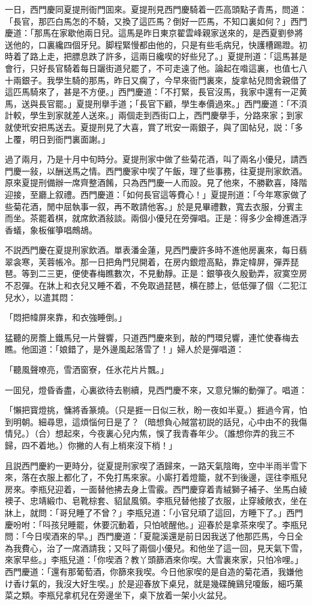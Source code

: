 一日，西門慶同夏提刑衙門囬來。夏提刑見西門慶騎着一匹高頭點子青馬，問道：「長官，那匹白馬怎的不騎，又換了這匹馬？倒好一匹馬，不知口裏如何？」西門慶道：「那馬在家歇他兩日兒。這馬是昨日東京翟雲峰親家送來的，是西夏劉參將送他的，口裏纔四個牙兒。脚程緊慢都由他的，只是有些毛病兒，快護槽踢蹬。初時着了路上走，把膘息跌了許多，這兩日纔喫的好些兒了。」夏提刑道：「這馬甚是會行，只好長官騎着每日躧街道兒罷了，不可走遠了他。論起在喒這裏，也值七八十兩銀子。我學生騎的那馬，昨日又瘸了，今早來衙門裏來，旋拿帖兒問舍親借了這匹馬騎來了，甚是不方便。」西門慶道：「不打緊，長官沒馬，我家中還有一疋黄馬，送與長官罷。」夏提刑擧手道；「長官下顧，學生奉價過來。」西門慶道：「不湏計較，學生到家就差人送來。」兩個走到西街口上，西門慶擧手，分路來家；到家就使玳安把馬送去。夏提刑見了大喜，賞了玳安一兩銀子，與了囬帖兒，説：「多上覆，明日到衙門裏面謝。」

過了兩月，乃是十月中旬時分。夏提刑家中做了些菊花酒，叫了兩名小優兒，請西門慶一敍，以酬送馬之情。西門慶家中喫了午飯，理了些事務，往夏提刑家飲酒。原來夏提刑備辦一席齊整酒餚，只為西門慶一人而設。見了他來，不勝歡喜，降階迎接，至廳上叙禮。西門慶道：「如何長官這等費心！」夏提刑道：「今年寒家做了些菊花酒，閒中屈執事一叙，再不敢請他客。」於是見畢禮數，寬去衣服，分賓主而坐。茶罷着棋，就席飲酒敍談。兩個小優兒在旁彈唱。正是：得多少金樽進酒浮香蟻，象板催箏唱鷓鴣。

不説西門慶在夏提刑家飲酒。單表潘金蓮，見西門慶許多時不進他房裏來，每日翡翠衾寒，芙蓉帳冷。那一日把角門兒開着，在房内銀燈高點，靠定幃屏，彈弄琵琶。等到二三更，便使春梅瞧數次，不見動靜。正是：銀箏夜久殷勤弄，寂寞空房不忍彈。在牀上和衣兒又睡不着，不免取過琵琶，横在膝上，低低彈了個〈二犯江兒水〉，以遣其悶：

「悶把幃屏來靠，和衣強睡倒。」

猛聽的房簷上鐵馬兒一片聲響，只道西門慶來到，敲的門環兒響，連忙使春梅去瞧。他囬道：「娘錯了，是外邊風起落雪了！」婦人於是彈唱道：

「聽風聲嘹亮，雪洒窗寮，任氷花片片飄。」

一囬兒，燈昏香盡，心裏欲待去剔續，見西門慶不來，又意兒懶的動彈了。唱道：

「懶把寳燈挑，慵將香篆燒。（只是捱一日似三秋，盼一夜如半夏。）捱過今宵，怕到明朝。細尋思，這煩惱何日是了？（暗想負心賊當初説的話兒，心中由不的我傷情兒。）（合）想起來，今夜裏心兒内焦，悞了我青春年少。（誰想你弄的我三不歸，四不着地。）你撇的人有上梢來沒下梢！」

且説西門慶約一更時分，従夏提刑家喫了酒歸來，一路天氣陰晦，空中半雨半雪下來，落在衣服上都化了，不免打馬來家。小廝打着燈籠，就不到後邊，逕往李瓶兒房來。李瓶兒迎着，一面替他拂去身上雪霰。西門慶穿着青絨獅子補子、坐馬白綾襖子、忠靖緞巾、皂靴棕套、貂鼠風領。李瓶兒替他接了衣服，止穿綾敞衣，坐在牀上，就問：「哥兒睡了不曾？」李瓶兒道：「小官兒頑了這回，方睡下了。」西門慶吩咐：「呌孩兒睡罷，休要沉動着，只怕唬醒他。」迎春於是拿茶來喫了。李瓶兒問：「今日喫酒來的早。」西門慶道：「夏龍溪還是前日因我送了他那匹馬，今日全為我費心，治了一席酒請我；又呌了兩個小優兒。和他坐了這一回，見天氣下雪，來家早些。」李瓶兒道：「你喫酒？教丫頭篩酒來你喫。大雪裏來家，只怕冷哩。」西門慶道：「還有那葡萄酒，你篩來我喫。今日他家喫的是自造的菊花酒，我嫌他け香け氣的，我沒大好生喫。」於是迎春放下桌兒，就是幾碟醃鷄兒嗄飯，細巧菓菜之類。李瓶兒拿杌兒在旁邊坐下，桌下放着一架小火盆兒。

